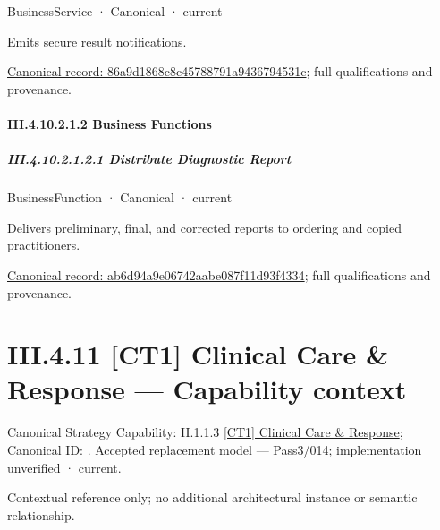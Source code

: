\label{element:86a9d1868c8c45788791a9436794531c}
{\small BusinessService · Canonical · current}\par

Emits secure result notifications.


{\footnotesize \href{../../../../../../../continuum/business/business-service/86a9d1868c8c45788791a9436794531c.md}{Canonical record: 86a9d1868c8c45788791a9436794531c}; full qualifications and provenance.}\par
\paragraph*{III.4.10.2.1.2 Business Functions}
\label{navigation:III.4.10.2.1.2}

\subparagraph*{III.4.10.2.1.2.1 Distribute Diagnostic Report}
\label{navigation:III.4.10.2.1.2.1}

\label{element:ab6d94a9e06742aabe087f11d93f4334}
{\small BusinessFunction · Canonical · current}\par

Delivers preliminary, final, and corrected reports to ordering and copied practitioners.


{\footnotesize \href{../../../../../../../continuum/business/business-function/ab6d94a9e06742aabe087f11d93f4334.md}{Canonical record: ab6d94a9e06742aabe087f11d93f4334}; full qualifications and provenance.}\par
\section*{III.4.11 [CT1] Clinical Care \& Response — Capability context}
\label{navigation:III.4.11}

{\small Canonical Strategy Capability: II.1.1.3 \hyperref[element:0962afc8439c4e1898a7e2ae3f4186a4]{[CT1] Clinical Care \& Response}; Canonical ID: \texttt{}. Accepted replacement model — Pass3/014; implementation unverified · current.}\par
Contextual reference only; no additional architectural instance or semantic relationship.\par
